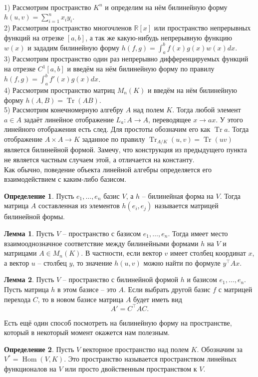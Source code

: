 \documentclass[10pt,a4paper,oneside]{book} %
\theoremstyle{definition}
\newtheorem*{defn}{Определение}
\newtheorem{lem}{Лемма}
\newcommand{\mb}[1]{\mathbb{#1}}
\newcommand{\Tr}{\operatorname{Tr}}
\newcommand{\tr}{\operatorname{Tr}}
\newcommand{\Hom}{\operatorname{Hom}}
\def\exm{\noindent {\bf Примеры:}}
\def\dfn{\begin{defn}}
\def\edfn{\end{defn}}
\def\lm{\begin{lem}}
\def\elm{\end{lem}}
\begin{document}
\exm\\
1) Рассмотрим пространство $K^n$ и определим на нём билинейную форму $h(u,v)=\sum_{i=1}^n x_iy_i$.\\
2) Рассмотрим пространство многочленов $\mb R[x]$ или пространство непрерывных функций на отрезке $[a,b]$, а так же какую-нибудь непрерывную функцию $w(x)$ и зададим билинейную форму $h(f,g)=\int_a^b f(x)g(x)w(x)dx$.\\
3) Рассмотрим пространство один раз непрерывно дифференцируемых функций на отрезке $C^1[a,b]$ и введём на нём билинейную форму по правилу $h(f,g)=\int_a^b f'(x)g(x)dx$.\\
4) Рассмотрим пространство матриц $M_n(K)$ и введём на нём билинейную форму $h(A,B)= \Tr(AB)$.\\
5) Рассмотрим конечномерную алгебру $A$ над полем $K$. Тогда любой элемент $a\in A$ задаёт линейное отображение $L_a \colon A \to A$, переводящее $x\to ax$. У этого линейного отображения есть след. Для простоты обозначим его как $\tr a$.
Тогда отображение $A\times A \to K$ заданное по правилу $\tr_{A/K}(u,v)=\tr(uv)$ является билинейной формой. Замечу, что конструкция из предыдущего пункта не является частным случаем этой, а отличается на константу.\\

Как обычно, поведение объекта линейной алгебры определяется его взаимодействием с каким-либо базисом.

\dfn Пусть $e_1, \dots, e_n$ базис $V$, а $h$ -- билинейная форма на $V$. Тогда матрица $A$ составленная из элементов $h(e_i,e_j)$ называется матрицей билинейной формы.
\edfn

\lm Пусть $V$ -- пространство с  базисом $e_1,\dots,e_n$. Тогда имеет место взаимооднозначное соответствие между билинейными формами $h$ на $V$ и матрицами  $A\in M_n(K)$. В частности, если вектор $v$ имеет столбец координат $x$, а вектор $u$ -- столбец $y$, то значение $h(u,v)$ можно найти по формуле $y^{\top}Ax$.
\elm

\lm Пусть $V$ -- пространство с билинейной формой $h$ и базисом $e_1,\dots,e_n$. Пусть матрица $h$ в этом базисе -- это $A$. Если выбрать другой базис $f$ с матрицей перехода $C$, то в новом базисе матрица $A$ будет иметь вид 
$$A'=C^{\top}AC.$$
\elm

Есть ещё один способ посмотреть на билинейную форму на пространстве, который в некоторый момент окажется нам полезным.


\begin{defn} Пусть $V$ векторное пространство над полем $K$. Обозначим за $V^*=\Hom(V,K)$. Это пространство называется пространством линейных функционалов на $V$ или просто двойственным пространством к $V$. 
\end{defn}
\end{document}
